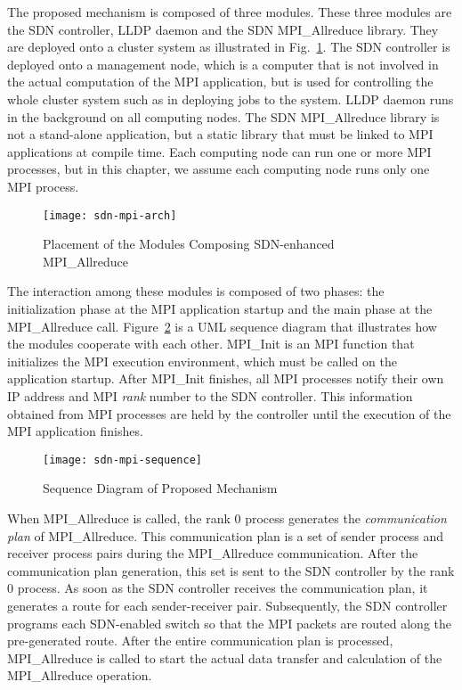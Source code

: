 The proposed mechanism is composed of three modules. These three modules are
the SDN controller, LLDP daemon and the SDN MPI\_Allreduce library. They are
deployed onto a cluster system as illustrated in
Fig.~\ref{fig:proposal-placement}. The SDN controller is deployed onto a
management node, which is a computer that is not involved in the actual
computation of the MPI application, but is used for controlling the whole
cluster system such as in deploying jobs to the system. LLDP daemon runs in
the background on all computing nodes. The SDN MPI\_Allreduce library is not a
stand-alone application, but a static library that must be linked to MPI
applications at compile time. Each computing node can run one or more MPI
processes, but in this chapter, we assume each computing node runs only one MPI
process.

\begin{figure}
    \centering
    \texttt{[image: sdn-mpi-arch]}
    \caption{Placement of the Modules Composing SDN-enhanced MPI\_Allreduce}%
    \label{fig:proposal-placement}
\end{figure}

The interaction among these modules is composed of two phases: the
initialization phase at the MPI application startup and the main phase at the
MPI\_Allreduce call. Figure~\ref{fig:proposal-sequence} is a UML sequence
diagram that illustrates how the modules cooperate with each other. MPI\_Init
is an MPI function that initializes the MPI execution environment, which must
be called on the application startup. After MPI\_Init finishes, all MPI
processes notify their own IP address and MPI \emph{rank} number to the SDN
controller. This information obtained from MPI processes are held by the
controller until the execution of the MPI application finishes.

\begin{figure}
    \centering
    \texttt{[image: sdn-mpi-sequence]}
    \caption{Sequence Diagram of Proposed Mechanism}%
    \label{fig:proposal-sequence}
\end{figure}

When MPI\_Allreduce is called, the rank 0 process generates the
\emph{communication plan} of MPI\_Allreduce. This communication plan is a set
of sender process and receiver process pairs during the MPI\_Allreduce
communication. After the communication plan generation, this set is sent to
the SDN controller by the rank 0 process. As soon as the SDN controller
receives the communication plan, it generates a route for each sender-receiver
pair. Subsequently, the SDN controller programs each SDN-enabled switch so
that the MPI packets are routed along the pre-generated route. After the
entire communication plan is processed, MPI\_Allreduce is called to start the
actual data transfer and calculation of the MPI\_Allreduce operation.

